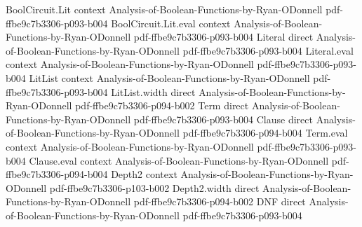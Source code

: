 \begin{theorem}
\leanok
{}
\proofstep
  {BoolCircuit.Lit}
  {context}
  {Analysis-of-Boolean-Functions-by-Ryan-ODonnell}
  {pdf-ffbe9c7b3306-p093-b004}
\proofstep
  {BoolCircuit.Lit.eval}
  {context}
  {Analysis-of-Boolean-Functions-by-Ryan-ODonnell}
  {pdf-ffbe9c7b3306-p093-b004}
\proofstep
  {Literal}
  {direct}
  {Analysis-of-Boolean-Functions-by-Ryan-ODonnell}
  {pdf-ffbe9c7b3306-p093-b004}
\proofstep
  {Literal.eval}
  {context}
  {Analysis-of-Boolean-Functions-by-Ryan-ODonnell}
  {pdf-ffbe9c7b3306-p093-b004}
\proofstep
  {LitList}
  {context}
  {Analysis-of-Boolean-Functions-by-Ryan-ODonnell}
  {pdf-ffbe9c7b3306-p093-b004}
\proofstep
  {LitList.width}
  {direct}
  {Analysis-of-Boolean-Functions-by-Ryan-ODonnell}
  {pdf-ffbe9c7b3306-p094-b002}
\proofstep
  {Term}
  {direct}
  {Analysis-of-Boolean-Functions-by-Ryan-ODonnell}
  {pdf-ffbe9c7b3306-p093-b004}
\proofstep
  {Clause}
  {direct}
  {Analysis-of-Boolean-Functions-by-Ryan-ODonnell}
  {pdf-ffbe9c7b3306-p094-b004}
\proofstep
  {Term.eval}
  {context}
  {Analysis-of-Boolean-Functions-by-Ryan-ODonnell}
  {pdf-ffbe9c7b3306-p093-b004}
\proofstep
  {Clause.eval}
  {context}
  {Analysis-of-Boolean-Functions-by-Ryan-ODonnell}
  {pdf-ffbe9c7b3306-p094-b004}
\proofstep
  {Depth2}
  {context}
  {Analysis-of-Boolean-Functions-by-Ryan-ODonnell}
  {pdf-ffbe9c7b3306-p103-b002}
\proofstep
  {Depth2.width}
  {direct}
  {Analysis-of-Boolean-Functions-by-Ryan-ODonnell}
  {pdf-ffbe9c7b3306-p094-b002}
\proofstep
  {DNF}
  {direct}
  {Analysis-of-Boolean-Functions-by-Ryan-ODonnell}
  {pdf-ffbe9c7b3306-p093-b004}

\end{theorem}

